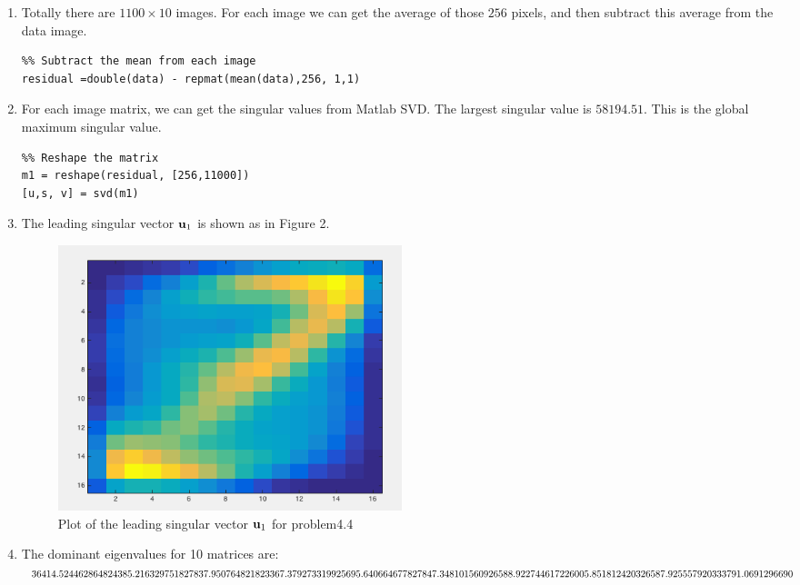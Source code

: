 \documentclass{article}
\begin{document}
\begin{enumerate}
 
 \item 
 Totally there are $1100\times10$ images. For each image we can get the average of those $256$ pixels, and then subtract this average from the data image. 
 \begin{lstlisting}
%% Subtract the mean from each image 
residual =double(data) - repmat(mean(data),256, 1,1)
 \end{lstlisting} 
 
 \item 
 For each image matrix, we can get the singular values from Matlab SVD. The largest singular value is $  58194.51$. This is the global maximum singular value. \\ 
 \begin{lstlisting}
%% Reshape the matrix
m1 = reshape(residual, [256,11000])
[u,s, v] = svd(m1) 

 \end{lstlisting} 
 
\item 
The leading singular vector $\boldsymbol{\mathrm{u}}_1$ is shown as in Figure 2. \\
\begin{figure}
\includegraphics[width=0.5\textwidth]{prob4_4}
\centering
\caption{Plot of the leading singular vector $\boldsymbol{\mathrm{u}}_1$ for problem4.4 }

\end{figure}
\item 
The dominant eigenvalues for 10 matrices are: \\
$36414.5244628648	\\24385.2163297518	\\27837.9507648218	\\23367.3792733199	
\\25695.6406646778	\\ 27847.3481015609	\\26588.9227446172	\\26005.8518124203	\\26587.9255579203	\\33791.0691296690\\$


\end{enumerate}
\end{document}
